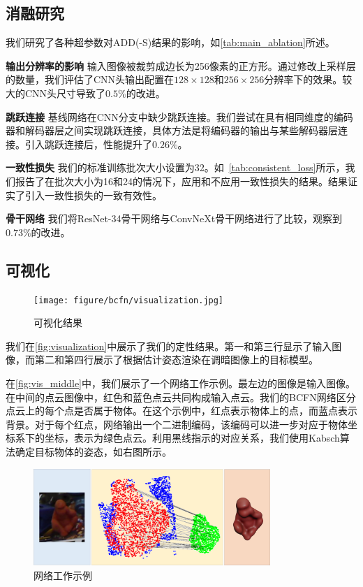 
\subsection{消融研究}

我们研究了各种超参数对ADD(-S)结果的影响，如\autoref{tab:main_ablation}所述。

\textbf{输出分辨率的影响 }输入图像被裁剪成边长为256像素的正方形。通过修改上采样层的数量，我们评估了CNN头输出配置在$128 \times 128$和$256 \times 256$分辨率下的效果。较大的CNN头尺寸导致了$0.5\%$的改进。

\textbf{跳跃连接 } 基线网络在CNN分支中缺少跳跃连接。我们尝试在具有相同维度的编码器和解码器层之间实现跳跃连接，具体方法是将编码器的输出与某些解码器层连接。引入跳跃连接后，性能提升了$0.26\%$。



\textbf{一致性损失 } 我们的标准训练批次大小设置为32。如~\cref{tab:consistent_loss}所示，我们报告了在批次大小为16和24的情况下，应用和不应用一致性损失的结果。结果证实了引入一致性损失的一致有效性。

\textbf{骨干网络 } 我们将ResNet-34骨干网络与ConvNeXt骨干网络进行了比较，观察到$0.73\%$的改进。

\subsection{可视化}

\begin{figure}[htbp]
\centerline{\texttt{[image: figure/bcfn/visualization.jpg]}}
    \caption{可视化结果}
    \label{fig:visualization}
\end{figure}

我们在\autoref{fig:visualization}中展示了我们的定性结果。第一和第三行显示了输入图像，而第二和第四行展示了根据估计姿态渲染在调暗图像上的目标模型。

在\autoref{fig:vis_middle}中，我们展示了一个网络工作示例。最左边的图像是输入图像。在中间的点云图像中，红色和蓝色点云共同构成输入点云。我们的BCFN网络区分点云上的每个点是否属于物体。在这个示例中，红点表示物体上的点，而蓝点表示背景。对于每个红点，网络输出一个二进制编码，该编码可以进一步对应于物体坐标系下的坐标，表示为绿色点云。利用黑线指示的对应关系，我们使用Kabsch算法确定目标物体的姿态，如右图所示。

\begin{figure}[htbp]
\centerline{\includegraphics[width=0.80\textwidth]{figure/bcfn/vis_middle.jpg}}
    \caption{网络工作示例}
    \label{fig:vis_middle}
\end{figure}

